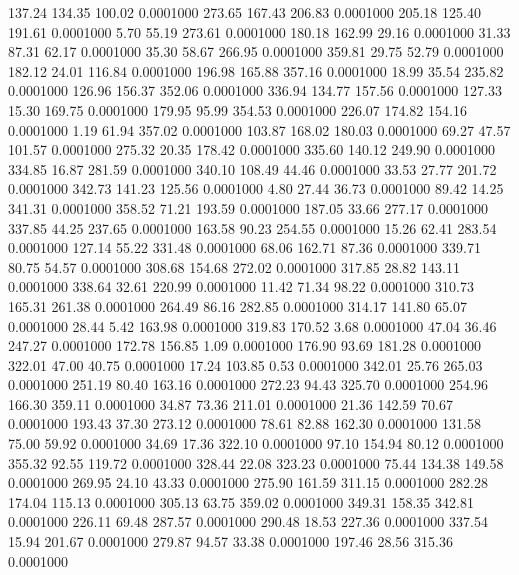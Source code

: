  137.24  134.35  100.02   0.0001000
 273.65  167.43  206.83   0.0001000
 205.18  125.40  191.61   0.0001000
   5.70   55.19  273.61   0.0001000
 180.18  162.99   29.16   0.0001000
  31.33   87.31   62.17   0.0001000
  35.30   58.67  266.95   0.0001000
 359.81   29.75   52.79   0.0001000
 182.12   24.01  116.84   0.0001000
 196.98  165.88  357.16   0.0001000
  18.99   35.54  235.82   0.0001000
 126.96  156.37  352.06   0.0001000
 336.94  134.77  157.56   0.0001000
 127.33   15.30  169.75   0.0001000
 179.95   95.99  354.53   0.0001000
 226.07  174.82  154.16   0.0001000
   1.19   61.94  357.02   0.0001000
 103.87  168.02  180.03   0.0001000
  69.27   47.57  101.57   0.0001000
 275.32   20.35  178.42   0.0001000
 335.60  140.12  249.90   0.0001000
 334.85   16.87  281.59   0.0001000
 340.10  108.49   44.46   0.0001000
  33.53   27.77  201.72   0.0001000
 342.73  141.23  125.56   0.0001000
   4.80   27.44   36.73   0.0001000
  89.42   14.25  341.31   0.0001000
 358.52   71.21  193.59   0.0001000
 187.05   33.66  277.17   0.0001000
 337.85   44.25  237.65   0.0001000
 163.58   90.23  254.55   0.0001000
  15.26   62.41  283.54   0.0001000
 127.14   55.22  331.48   0.0001000
  68.06  162.71   87.36   0.0001000
 339.71   80.75   54.57   0.0001000
 308.68  154.68  272.02   0.0001000
 317.85   28.82  143.11   0.0001000
 338.64   32.61  220.99   0.0001000
  11.42   71.34   98.22   0.0001000
 310.73  165.31  261.38   0.0001000
 264.49   86.16  282.85   0.0001000
 314.17  141.80   65.07   0.0001000
  28.44    5.42  163.98   0.0001000
 319.83  170.52    3.68   0.0001000
  47.04   36.46  247.27   0.0001000
 172.78  156.85    1.09   0.0001000
 176.90   93.69  181.28   0.0001000
 322.01   47.00   40.75   0.0001000
  17.24  103.85    0.53   0.0001000
 342.01   25.76  265.03   0.0001000
 251.19   80.40  163.16   0.0001000
 272.23   94.43  325.70   0.0001000
 254.96  166.30  359.11   0.0001000
  34.87   73.36  211.01   0.0001000
  21.36  142.59   70.67   0.0001000
 193.43   37.30  273.12   0.0001000
  78.61   82.88  162.30   0.0001000
 131.58   75.00   59.92   0.0001000
  34.69   17.36  322.10   0.0001000
  97.10  154.94   80.12   0.0001000
 355.32   92.55  119.72   0.0001000
 328.44   22.08  323.23   0.0001000
  75.44  134.38  149.58   0.0001000
 269.95   24.10   43.33   0.0001000
 275.90  161.59  311.15   0.0001000
 282.28  174.04  115.13   0.0001000
 305.13   63.75  359.02   0.0001000
 349.31  158.35  342.81   0.0001000
 226.11   69.48  287.57   0.0001000
 290.48   18.53  227.36   0.0001000
 337.54   15.94  201.67   0.0001000
 279.87   94.57   33.38   0.0001000
 197.46   28.56  315.36   0.0001000
